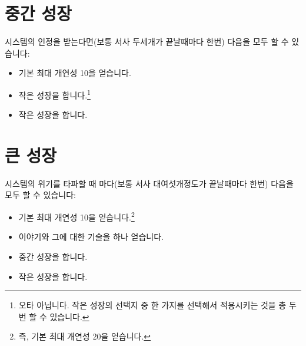 \documentclass{report}
\begin{document}
	\section*{중간 성장}
	시스템의 인정을 받는다면(보통 서사 두세개가 끝날때마다 한번) 다음을 모두 할 수 있습니다:
	\begin{itemize}
		\item 기본 최대 개연성 10을 얻습니다.
		\item 작은 성장을 합니다.\footnote{\label{medium-upgrade-small-upgrade}오타 아닙니다. 작은 성장의 선택지 중 한 가지를 선택해서 적용시키는 것을 총 두번 할 수 있습니다.}
		\item 작은 성장을 합니다.
	\end{itemize}
	
	\section*{큰 성장}
	시스템의 위기를 타파할 때 마다(보통 서사 대여섯개정도가 끝날때마다 한번) 다음을 모두 할 수 있습니다:
	\begin{itemize}
		\item 기본 최대 개연성 10을 얻습니다.\footnote{\label{big-upgrade-cost}즉, 기본 최대 개연성 20을 얻습니다.}
		\item 이야기와 그에 대한 기술을 하나 얻습니다.
		\item 중간 성장을 합니다.
		\item 작은 성장을 합니다.
	\end{itemize}
	
\end{document}
